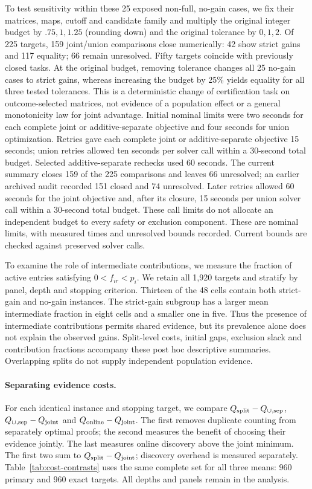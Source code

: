 To test sensitivity within these 25 exposed non-full, no-gain cases, we fix their matrices, maps, cutoff and candidate family and multiply the original integer budget by $.75,1,1.25$ (rounding down) and the original tolerance by $0,1,2$. Of 225 targets, 159 joint/union comparisons close numerically: 42 show strict gains and 117 equality; 66 remain unresolved. Fifty targets coincide with previously closed tasks. At the original budget, removing tolerance changes all 25 no-gain cases to strict gains, whereas increasing the budget by 25\% yields equality for all three tested tolerances. This is a deterministic change of certification task on outcome-selected matrices, not evidence of a population effect or a general monotonicity law for joint advantage. Initial nominal limits were two seconds for each complete joint or additive-separate objective and four seconds for union optimization. Retries gave each complete joint or additive-separate objective 15 seconds; union retries allowed ten seconds per solver call within a 30-second total budget. Selected additive-separate rechecks used 60 seconds. The current summary closes 159 of the 225 comparisons and leaves 66 unresolved; an earlier archived audit recorded 151 closed and 74 unresolved. Later retries allowed 60 seconds for the joint objective and, after its closure, 15 seconds per union solver call within a 30-second total budget. These call limits do not allocate an independent budget to every safety or exclusion component. These are nominal limits, with measured times and unresolved bounds recorded. Current bounds are checked against preserved solver calls.

To examine the role of intermediate contributions, we measure the fraction of active entries satisfying $0<f_{ir}<p_i$. We retain all 1,920 targets and stratify by panel, depth and stopping criterion. Thirteen of the 48 cells contain both strict-gain and no-gain instances. The strict-gain subgroup has a larger mean intermediate fraction in eight cells and a smaller one in five. Thus the presence of intermediate contributions permits shared evidence, but its prevalence alone does not explain the observed gains. Split-level costs, initial gaps, exclusion slack and contribution fractions accompany these post hoc descriptive summaries. Overlapping splits do not supply independent population evidence.



\paragraph{Separating evidence costs.}
For each identical instance and stopping target, we compare $Q_{\rm split}-Q_{\cup,\rm sep}$, $Q_{\cup,\rm sep}-Q_{\rm joint}$ and $Q_{\rm online}-Q_{\rm joint}$. The first removes duplicate counting from separately optimal proofs; the second measures the benefit of choosing their evidence jointly. The last measures online discovery above the joint minimum. The first two sum to $Q_{\rm split}-Q_{\rm joint}$; discovery overhead is measured separately. Table~\ref{tab:cost-contrasts} uses the same complete set for all three means: 960 primary and 960 exact targets. All depths and panels remain in the analysis.

